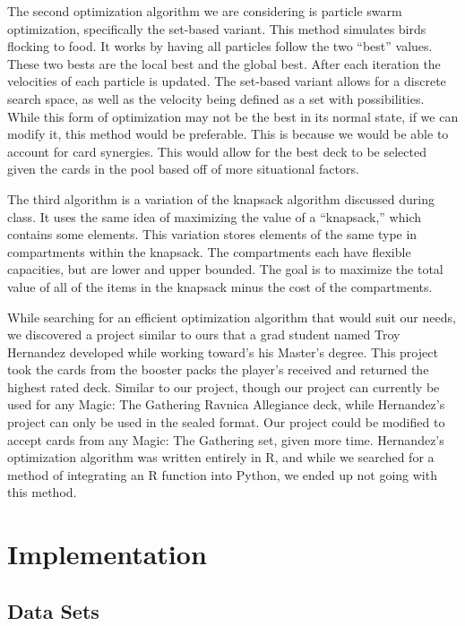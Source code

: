 \documentclass[12pt, letterpaper]{article}
\begin{document}
\label{paragraph:Particle Swarm}
The second optimization algorithm we are considering is particle swarm optimization,
specifically the set-based variant.
This method simulates birds flocking to food.
It works by having all particles follow the two \enquote{best} values.
These two bests are the local best and the global best.
After each iteration the velocities of each particle is updated.
The set-based variant allows for a discrete search space,
as well as the velocity being defined as a set with possibilities.
While this form of optimization may not be the best in its normal state,
if we can modify it, this method would be preferable.
This is because we would be able to account for card synergies.
This would allow for the best deck to be selected given the cards
in the pool based off of more situational factors.

The third algorithm is a variation of the knapsack algorithm discussed during class.
It uses the same idea of maximizing the value of a \enquote{knapsack,}
which contains some elements.
This variation stores elements of the same type in compartments within the knapsack.
The compartments each have flexible capacities, but are lower and upper bounded.
The goal is to maximize the total value of all of the items in the knapsack
minus the cost of the compartments.


While searching for an efficient optimization algorithm that would suit our needs,
we discovered a project similar to ours that a grad student
named Troy Hernandez developed while working toward's his Master's degree.
This project took the cards from the booster packs the player's received
and returned the highest rated deck.
Similar to our project, though our project can currently be used for any Magic: The Gathering
Ravnica Allegiance deck, while Hernandez's project can only be used in the sealed format.
Our project could be modified to accept cards from any Magic: The Gathering set,
given more time.
Hernandez's optimization algorithm was written entirely in R,
and while we searched for a method of integrating an R function
into Python, we ended up not going with this method.

\section{Implementation}

\subsection{Data Sets}
\end{document}

